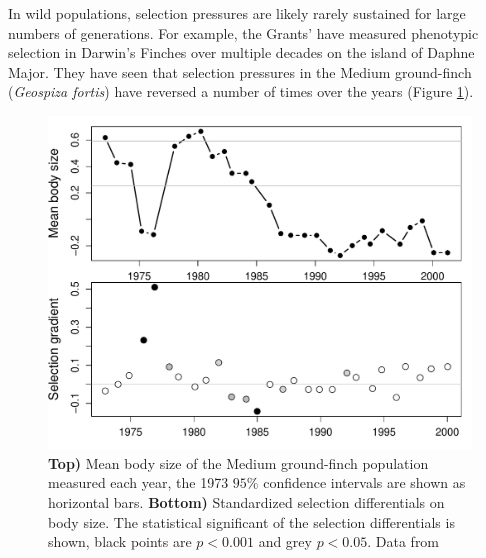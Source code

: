 In wild populations, selection pressures are likely rarely sustained 
for large numbers of generations. For example, the Grants' have
measured phenotypic selection in Darwin's Finches over multiple
decades on the island of Daphne Major. They have seen that
selection pressures in the Medium ground-finch ({\it Geospiza fortis})
have reversed a number of times over the years (Figure
\ref{fig:Darwins_Finches_unpred}). 

\begin{figure}
\begin{center}
\includegraphics[width= 0.8 \textwidth]{Journal_figs/Quant_gen/Darwins_Finches_unpred/Darwins_Finches_unpred.pdf}
\end{center}
\caption[4cm]{{\bf Top)} Mean body size of the Medium ground-finch
  population measured each year, the 1973 $95\%$ confidence intervals
  are shown as horizontal bars. {\bf Bottom)} Standardized
  selection differentials on body size. The statistical significant of
  the selection differentials is shown, black points are $p<0.001$ and grey $p<0.05$.
  Data from \citet{grant2002unpredictable} } \label{fig:Darwins_Finches_unpred}  
\end{figure}

